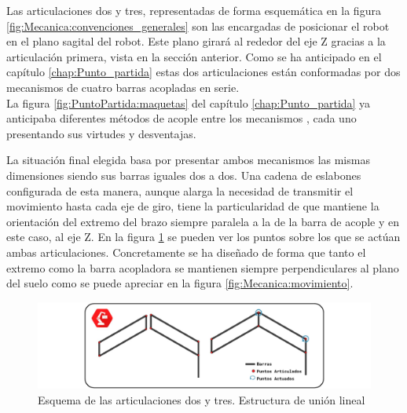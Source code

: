     Las articulaciones dos y tres, representadas de forma esquemática en la figura \ref{fig:Mecanica:convenciones_generales} son las encargadas de posicionar el robot en el plano sagital del robot. Este plano girará al rededor del eje Z gracias a la articulación primera, vista en la sección anterior. Como se ha anticipado en el capítulo \ref{chap:Punto_partida} estas dos articulaciones están conformadas por dos mecanismos de cuatro barras acopladas en serie.
    \\

    La figura \ref{fig:PuntoPartida:maquetas} del capítulo \ref{chap:Punto_partida} ya anticipaba diferentes métodos de acople entre los mecanismos , cada uno presentando sus virtudes y desventajas.
    \\

	
	La situación final elegida basa por presentar ambos mecanismos las mismas dimensiones siendo sus barras iguales dos a dos. Una cadena de eslabones configurada de esta manera, aunque alarga la necesidad de transmitir el movimiento hasta cada eje de giro, tiene la particularidad de que mantiene la orientación del extremo del brazo siempre paralela a la de la barra de acople y en este caso, al eje Z. En la figura \ref{fig:Mecanica:4_bar_mecanism} se pueden ver los puntos sobre los que se actúan ambas articulaciones. Concretamente se ha diseñado de forma que tanto el extremo como la barra acopladora se mantienen siempre perpendiculares al plano del suelo como se puede apreciar en la figura \ref{fig:Mecanica:movimiento}.
    \\

    \begin{figure}[H]
    	\centering
    	\includegraphics[width=\textwidth]{figuras/Imagenes_Mecanica/mecanismos_4_barras.jpg}
    	\caption{Esquema de las articulaciones dos y tres. Estructura de unión lineal}
    	\label{fig:Mecanica:4_bar_mecanism}
    \end{figure}
    
